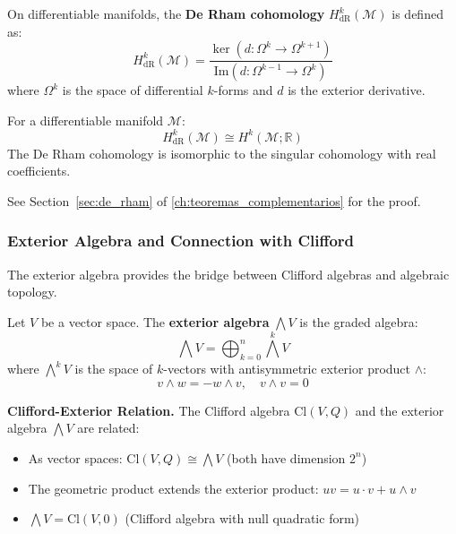 \begin{definition}\label{def:cohomologia_derham}
On differentiable manifolds, the \textbf{De Rham cohomology} $H^k_{\text{dR}}(\mathcal{M})$ is defined as:
\[H^k_{\text{dR}}(\mathcal{M}) = \frac{\ker(d: \Omega^k \to \Omega^{k+1})}{\text{Im}(d: \Omega^{k-1} \to \Omega^k)}\]
where $\Omega^k$ is the space of differential $k$-forms and $d$ is the exterior derivative.
\end{definition}

\begin{theorem}\label{thm:derham}
For a differentiable manifold $\mathcal{M}$:
\[H^k_{\text{dR}}(\mathcal{M}) \cong H^k(\mathcal{M}; \mathbb{R})\]
The De Rham cohomology is isomorphic to the singular cohomology with real coefficients.

See Section~\ref{sec:de_rham} of \autoref{ch:teoremas_complementarios} for the proof.
\end{theorem}

\subsubsection{Exterior Algebra and Connection with Clifford}

The exterior algebra provides the bridge between Clifford algebras and algebraic topology.

\begin{definition}\label{def:algebra_exterior}
Let $V$ be a vector space. The \textbf{exterior algebra} $\bigwedge V$ is the graded algebra:
\[\bigwedge V = \bigoplus_{k=0}^n \bigwedge^k V\]
where $\bigwedge^k V$ is the space of $k$-vectors with antisymmetric exterior product $\wedge$:
\[v \wedge w = -w \wedge v, \quad v \wedge v = 0\]
\end{definition}

\textbf{Clifford-Exterior Relation.}\label{rem:clifford_exterior} The Clifford algebra $\text{Cl}(V, Q)$ and the exterior algebra $\bigwedge V$ are related:
\begin{itemize}
    \item As vector spaces: $\text{Cl}(V,Q) \cong \bigwedge V$ (both have dimension $2^n$)
    \item The geometric product extends the exterior product: $uv = u \cdot v + u \wedge v$
    \item $\bigwedge V = \text{Cl}(V, 0)$ (Clifford algebra with null quadratic form)
\end{itemize}

